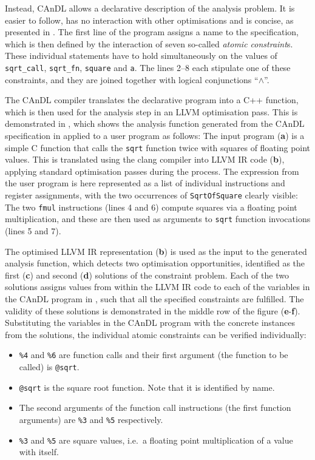     Instead, CAnDL allows a declarative description of the analysis problem.
    It is easier to follow, has no interaction with other optimisations and
    is concise, as presented in .
    The first line of the program assigns a name to the specification, which is
    then defined by the interaction of seven so-called {\em atomic constraint}s.
    These individual statements have to hold simultaneously on the values of
    \texttt{sqrt\_call}, \texttt{sqrt\_fn}, \texttt{square} and \texttt{a}.
    The lines 2--8 each stipulate one of these constraints, and they are joined
    together with logical conjunctions ``$\land$''.

    The CAnDL compiler translates the declarative program into a C++ function,
    which is then used for the analysis step in an LLVM optimisation pass.
    This is demonstrated in , which shows the analysis
    function generated from the CAnDL specification in 
    applied to a user program as follows:
    The input program ({\bf a}) is a simple C function that calls the
    \texttt{sqrt} function twice with squares of floating point values.
    This is translated using the clang compiler into LLVM IR code ({\bf b}),
    applying standard optimisation passes during the process.
    The expression from the user program is here represented as a list of
    individual instructions and register assignments, with the two occurrences
    of \texttt{SqrtOfSquare} clearly visible:
    The two \texttt{fmul} instructions (lines 4 and 6) compute squares via a
    floating point multiplication, and these are then used as arguments to
    \texttt{sqrt} function invocations (lines 5 and 7).

    The optimised LLVM IR representation ({\bf b}) is used as the input to the
    generated analysis function, which detects two optimisation opportunities,
    identified as the first ({\bf c}) and second ({\bf d}) solutions of the
    constraint problem.
    Each of the two solutions assigns values from within the LLVM IR code to
    each of the variables in the CAnDL program in , such
    that all the specified constraints are fulfilled.
    The validity of these solutions is demonstrated in the middle row of the
    figure ({\bf e}-{\bf f}).
    Substituting the variables in the CAnDL program with the concrete instances
    from the solutions, the individual atomic constraints can be verified
    individually:
    \begin{itemize}
    \item \texttt{\%4} and \texttt{\%6} are function calls and their first
          argument (the function to be called) is \texttt{@sqrt}.
    \item \texttt{@sqrt} is the square root function.
          Note that it is identified by name.
    \item The second arguments of the function call instructions (the first
          function arguments) are \texttt{\%3} and \texttt{\%5}
          respectively.
    \item \texttt{\%3} and \texttt{\%5} are square values, i.e.\ a floating
          point multiplication of a value with itself.
    \end{itemize}


